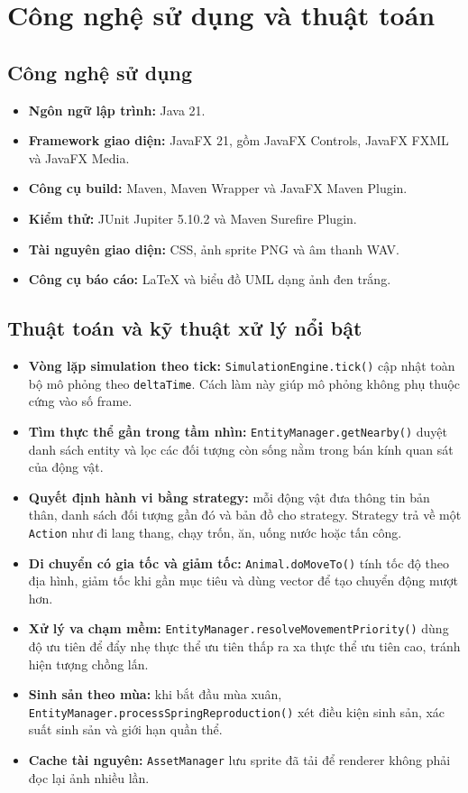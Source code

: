 \documentclass[12pt,a4paper]{article}
\begin{document}
\section{Công nghệ sử dụng và thuật toán}

\subsection{Công nghệ sử dụng}

\begin{itemize}
    \item \textbf{Ngôn ngữ lập trình:} Java 21.
    \item \textbf{Framework giao diện:} JavaFX 21, gồm JavaFX Controls, JavaFX FXML và JavaFX Media.
    \item \textbf{Công cụ build:} Maven, Maven Wrapper và JavaFX Maven Plugin.
    \item \textbf{Kiểm thử:} JUnit Jupiter 5.10.2 và Maven Surefire Plugin.
    \item \textbf{Tài nguyên giao diện:} CSS, ảnh sprite PNG và âm thanh WAV.
    \item \textbf{Công cụ báo cáo:} LaTeX và biểu đồ UML dạng ảnh đen trắng.
\end{itemize}

\subsection{Thuật toán và kỹ thuật xử lý nổi bật}

\begin{itemize}
    \item \textbf{Vòng lặp simulation theo tick:} \texttt{SimulationEngine.tick()} cập nhật toàn bộ mô phỏng theo \texttt{deltaTime}. Cách làm này giúp mô phỏng không phụ thuộc cứng vào số frame.
    \item \textbf{Tìm thực thể gần trong tầm nhìn:} \texttt{EntityManager.getNearby()} duyệt danh sách entity và lọc các đối tượng còn sống nằm trong bán kính quan sát của động vật.
    \item \textbf{Quyết định hành vi bằng strategy:} mỗi động vật đưa thông tin bản thân, danh sách đối tượng gần đó và bản đồ cho strategy. Strategy trả về một \texttt{Action} như đi lang thang, chạy trốn, ăn, uống nước hoặc tấn công.
    \item \textbf{Di chuyển có gia tốc và giảm tốc:} \texttt{Animal.doMoveTo()} tính tốc độ theo địa hình, giảm tốc khi gần mục tiêu và dùng vector để tạo chuyển động mượt hơn.
    \item \textbf{Xử lý va chạm mềm:} \texttt{EntityManager.resolveMovementPriority()} dùng độ ưu tiên để đẩy nhẹ thực thể ưu tiên thấp ra xa thực thể ưu tiên cao, tránh hiện tượng chồng lấn.
    \item \textbf{Sinh sản theo mùa:} khi bắt đầu mùa xuân, \texttt{EntityManager.processSpringReproduction()} xét điều kiện sinh sản, xác suất sinh sản và giới hạn quần thể.
    \item \textbf{Cache tài nguyên:} \texttt{AssetManager} lưu sprite đã tải để renderer không phải đọc lại ảnh nhiều lần.
\end{itemize}
\end{document}
